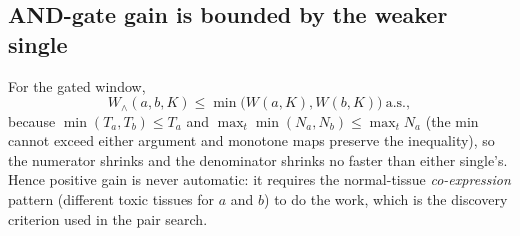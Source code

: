\subsection{AND-gate gain is bounded by the weaker single}
For the gated window,
\begin{equation}
W_\wedge(a,b,K)\le \min\big(W(a,K),W(b,K)\big)\ \text{a.s.},
\end{equation}
because $\min(T_a,T_b)\le T_a$ and $\max_t\min(N_a,N_b)\le\max_t N_a$ (the min
cannot exceed either argument and monotone maps preserve the inequality), so
the numerator shrinks and the denominator shrinks no faster than either
single's. Hence positive gain is never automatic: it requires the normal-tissue
\emph{co-expression} pattern (different toxic tissues for $a$ and $b$) to do
the work, which is the discovery criterion used in the pair search.
